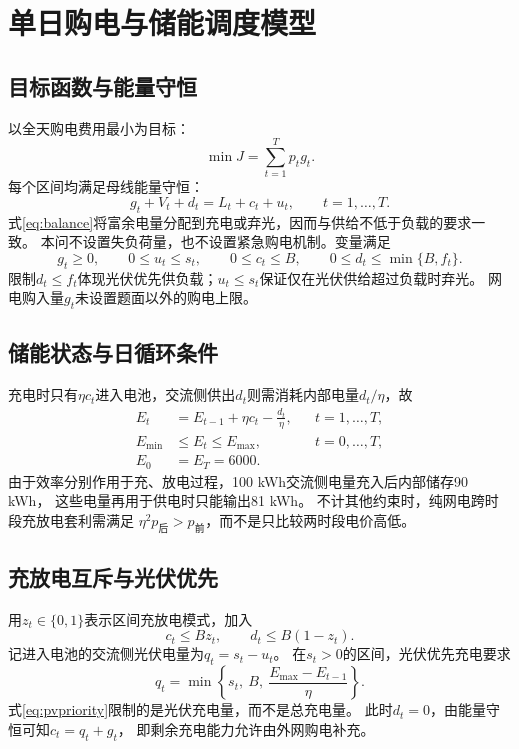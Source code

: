 \documentclass[UTF8,a4paper,12pt,fontset=fandol]{ctexart}
\begin{document}
\section{单日购电与储能调度模型}
\subsection{目标函数与能量守恒}
以全天购电费用最小为目标：
\begin{equation}
  \min J=\sum_{t=1}^{T}p_tg_t.
  \label{eq:objective}
\end{equation}
每个区间均满足母线能量守恒：
\begin{equation}
  g_t+V_t+d_t=L_t+c_t+u_t,\qquad t=1,\ldots,T.
  \label{eq:balance}
\end{equation}
式\eqref{eq:balance}将富余电量分配到充电或弃光，因而与供给不低于负载的要求一致。
本问不设置失负荷量，也不设置紧急购电机制。变量满足
\begin{equation}
  g_t\ge0,\qquad 0\le u_t\le s_t,\qquad
  0\le c_t\le B,\qquad 0\le d_t\le\min\{B,f_t\}.
  \label{eq:flowbounds}
\end{equation}
限制$d_t\le f_t$体现光伏优先供负载；$u_t\le s_t$保证仅在光伏供给超过负载时弃光。
网电购入量$g_t$未设置题面以外的购电上限。

\subsection{储能状态与日循环条件}
充电时只有$\eta c_t$进入电池，交流侧供出$d_t$则需消耗内部电量$d_t/\eta$，故
\begin{align}
  E_t&=E_{t-1}+\eta c_t-\frac{d_t}{\eta},
       &&t=1,\ldots,T, \label{eq:state}\\
  E_{\min}&\le E_t\le E_{\max},
       &&t=0,\ldots,T, \label{eq:soc}\\
  E_0&=E_T=6000. && \label{eq:terminal}
\end{align}
由于效率分别作用于充、放电过程，100 kWh交流侧电量充入后内部储存90 kWh，
这些电量再用于供电时只能输出81 kWh。
不计其他约束时，纯网电跨时段充放电套利需满足
$\eta^2p_{\mathrm{后}}>p_{\mathrm{前}}$，而不是只比较两时段电价高低。

\subsection{充放电互斥与光伏优先}
用$z_t\in\{0,1\}$表示区间充放电模式，加入
\begin{equation}
  c_t\le Bz_t,\qquad d_t\le B(1-z_t).
  \label{eq:mode}
\end{equation}
记进入电池的交流侧光伏电量为$q_t=s_t-u_t$。
在$s_t>0$的区间，光伏优先充电要求
\begin{equation}
  q_t=\min\left\{s_t,\ B,\ \frac{E_{\max}-E_{t-1}}{\eta}\right\}.
  \label{eq:pvpriority}
\end{equation}
式\eqref{eq:pvpriority}限制的是光伏充电量，而不是总充电量。
此时$d_t=0$，由能量守恒可知$c_t=q_t+g_t$，
即剩余充电能力允许由外网购电补充。
\end{document}
